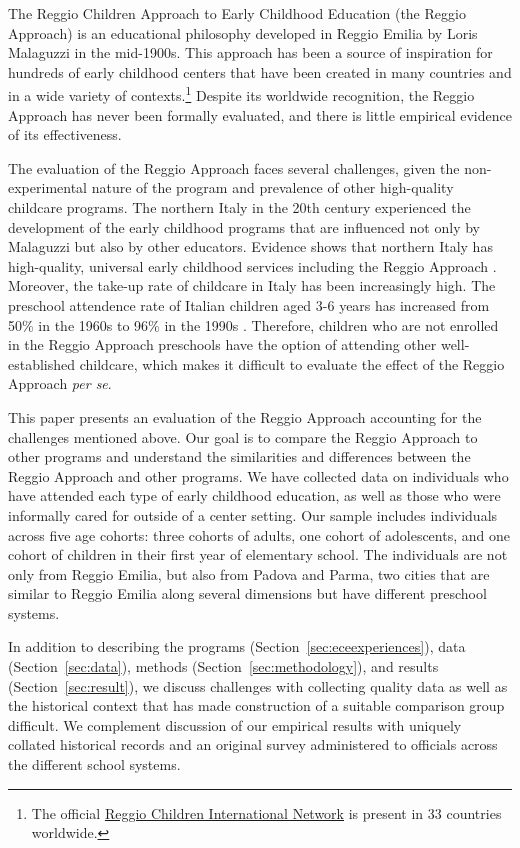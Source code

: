 
The Reggio Children Approach to Early Childhood Education (the Reggio Approach) is an educational philosophy developed in Reggio Emilia by Loris Malaguzzi in the mid-1900s. This approach has been a source of inspiration for hundreds of early childhood centers that have been created in many countries and in a wide variety of contexts.\footnote{The official \href{http://www.reggiochildren.it/network/?lang=en}{Reggio Children International Network} is present in 33 countries worldwide.} Despite its worldwide recognition, the Reggio Approach has never been formally evaluated, and there is little empirical evidence of its effectiveness. 

The evaluation of the Reggio Approach faces several challenges, given the non-experimental nature of the program and prevalence of other high-quality childcare programs. The northern Italy in the 20th century experienced the development of the early childhood programs that are influenced not only by Malaguzzi but also by other educators. Evidence shows that northern Italy has high-quality, universal early childhood services including the Reggio Approach \citep{OECD_2001_Italy-Country-Note}. Moreover, the take-up rate of childcare in Italy has been increasingly high. The preschool attendence rate of Italian children aged 3-6 years has increased from 50\% in the 1960s to 96\% in the 1990s \citep{Hohnerlein_2015_Development-and-Diffusion}. Therefore, children who are not enrolled in the Reggio Approach preschools have the option of attending other well-established childcare, which makes it difficult to evaluate the effect of the Reggio Approach \textit{per se}. 

This paper presents an evaluation of the Reggio Approach accounting for the challenges mentioned above. Our goal is to compare the Reggio Approach to other programs and understand the similarities and differences between the Reggio Approach and other programs. We have collected data on individuals who have attended each type of early childhood education, as well as those who were informally cared for outside of a center setting. Our sample includes individuals across five age cohorts: three cohorts of adults, one cohort of adolescents, and one cohort of children in their first year of elementary school. The individuals are not only from Reggio Emilia, but also from Padova and Parma, two cities that are similar to Reggio Emilia along several dimensions but have different preschool systems.  

In addition to describing the programs (Section~\ref{sec:eceexperiences}), data (Section~\ref{sec:data}), methods (Section~\ref{sec:methodology}), and results (Section~\ref{sec:result}), we discuss challenges with collecting quality data as well as the historical context that has made construction of a suitable comparison group difficult. We complement discussion of our empirical results with uniquely collated historical records and an original survey administered to officials across the different school systems.

